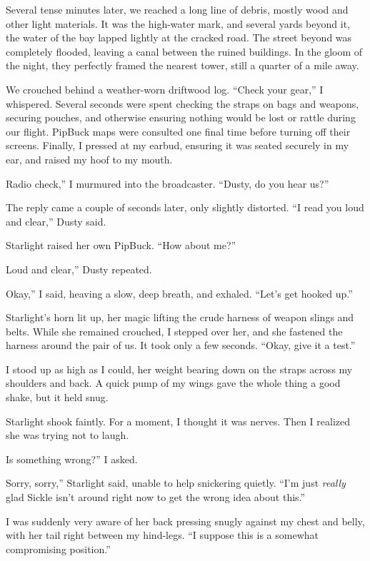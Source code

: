 Several tense minutes later, we reached a long line of debris, mostly wood and other light materials. It was the high-water mark, and several yards beyond it, the water of the bay lapped lightly at the cracked road. The street beyond was completely flooded, leaving a canal between the ruined buildings. In the gloom of the night, they perfectly framed the nearest tower, still a quarter of a mile away.

We crouched behind a weather-worn driftwood log. “Check your gear,” I whispered. Several seconds were spent checking the straps on bags and weapons, securing pouches, and otherwise ensuring nothing would be lost or rattle during our flight. PipBuck maps were consulted one final time before turning off their screens. Finally, I pressed at my earbud, ensuring it was seated securely in my ear, and raised my hoof to my mouth.

\leavevmode{}Radio check,” I murmured into the broadcaster. “Dusty, do you hear us?”

The reply came a couple of seconds later, only slightly distorted. “I read you loud and clear,” Dusty said.

Starlight raised her own PipBuck. “How about me?”

\leavevmode{}Loud and clear,” Dusty repeated.

\leavevmode{}Okay,” I said, heaving a slow, deep breath, and exhaled. “Let’s get hooked up.”

Starlight’s horn lit up, her magic lifting the crude harness of weapon slings and belts. While she remained crouched, I stepped over her, and she fastened the harness around the pair of us. It took only a few seconds. “Okay, give it a test.”

I stood up as high as I could, her weight bearing down on the straps across my shoulders and back. A quick pump of my wings gave the whole thing a good shake, but it held snug.

Starlight shook faintly. For a moment, I thought it was nerves. Then I realized she was trying not to laugh.

\leavevmode{}Is something wrong?” I asked.

\leavevmode{}Sorry, sorry,” Starlight said, unable to help snickering quietly. “I’m just \textit{really} glad Sickle isn’t around right now to get the wrong idea about this.”

I was suddenly very aware of her back pressing snugly against my chest and belly, with her tail right between my hind-legs. “I suppose this is a somewhat compromising position.”

